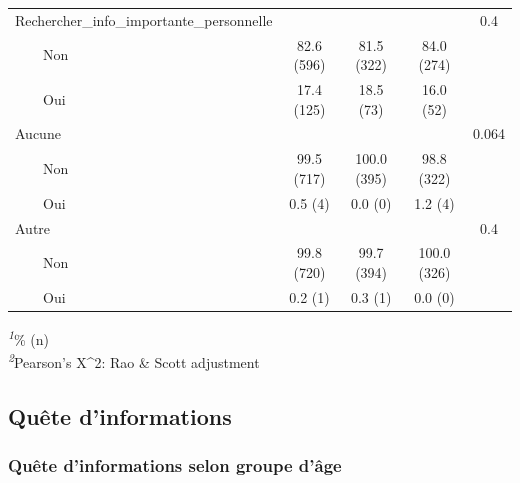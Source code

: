 \documentclass[
]{article}
\begin{document}
\begin{table}[!t]
\begin{tabular*}{\linewidth}{@{\extracolsep{\fill}}lcccc}
Rechercher\_info\_importante\_personnelle &  &  &  & 0.4 \\ 
    Non & 82.6 (596) & 81.5 (322) & 84.0 (274) &  \\ 
    Oui & 17.4 (125) & 18.5 (73) & 16.0 (52) &  \\ 
Aucune &  &  &  & 0.064 \\ 
    Non & 99.5 (717) & 100.0 (395) & 98.8 (322) &  \\ 
    Oui & 0.5 (4) & 0.0 (0) & 1.2 (4) &  \\ 
Autre &  &  &  & 0.4 \\ 
    Non & 99.8 (720) & 99.7 (394) & 100.0 (326) &  \\ 
    Oui & 0.2 (1) & 0.3 (1) & 0.0 (0) &  \\ 
\bottomrule
\end{tabular*}
\begin{minipage}{\linewidth}
\textsuperscript{\textit{1}}\% (n)\\
\textsuperscript{\textit{2}}Pearson's X\^{}2: Rao \& Scott adjustment\\
\end{minipage}
\end{table}

\hypertarget{quuxeate-dinformations}{%
\subsection{Quête d'informations}\label{quuxeate-dinformations}}

\vspace{1cm}

\hypertarget{quuxeate-dinformations-selon-groupe-duxe2ge}{%
\subsubsection{Quête d'informations selon groupe
d'âge}\label{quuxeate-dinformations-selon-groupe-duxe2ge}}
\end{document}
